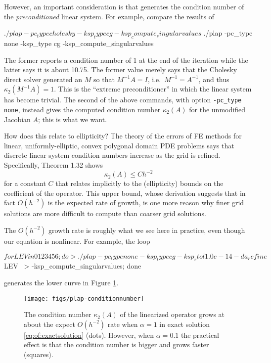 However, an important consideration is that \PETSc generates the condition number of the \emph{preconditioned} linear system.  For example, compare the results of
\begin{cline}
$ ./plap -pc_type cholesky -ksp_type cg -ksp_compute_singularvalues
$ ./plap -pc_type none -ksp_type cg -ksp_compute_singularvalues
\end{cline}
The former reports a condition number of 1 at the end of the iteration while the latter says it is about 10.75.  The former value merely says that the Cholesky direct solver generated an $M$ so that $M^{-1} A=I$, i.e.~$M^{-1}=A^{-1}$, and thus $\kappa_2(M^{-1} A)=1$.  This is the ``extreme preconditioner'' in which the linear system has become trivial.  The second of the above commands, with option \texttt{-pc\_type none}, instead gives the computed condition number $\kappa_2(A)$ for the unmodified Jacobian $A$; this is what we want.

How does this relate to ellipticity?  The theory of the errors of FE methods for linear, uniformly-elliptic, convex polygonal domain PDE problems says that discrete linear system condition numbers increase as the grid is refined.  Specifically,  \citet{Elmanetal2005} Theorem 1.32 shows
    $$\kappa_2(A) \le C h^{-2}$$
for a constant $C$ that relates implicitly to the (ellipticity) bounds on the coefficient of the operator.  This upper bound, whose derivation suggests that in fact $O(h^{-2})$ is the expected rate of growth, is one more reason why finer grid solutions are more difficult to compute than coarser grid solutions.

The $O(h^{-2})$ growth rate is roughly what we see here in practice, even though our equation is nonlinear.  For example, the loop
\begin{cline}
$ for LEV in 0 1 2 3 4 5 6; do
>   ./plap -pc_type none -ksp_type cg -ksp_rtol 1.0e-14 -da_refine $LEV \
>      -ksp_compute_singularvalues; done
\end{cline}
generates the lower curve in Figure \ref{fig:of:plap-conditionnumber}.

\begin{figure}
\texttt{[image: figs/plap-conditionnumber]}
\caption{The condition number $\kappa_2(A)$ of the linearized operator grows at about the expect $O(h^{-2})$ rate when $\alpha=1$ in exact solution \eqref{eq:of:exactsolution} (dots).  However, when $\alpha=0.1$ the practical effect is that the condition number is bigger and grows faster (squares).}
\label{fig:of:plap-conditionnumber}
\end{figure}


